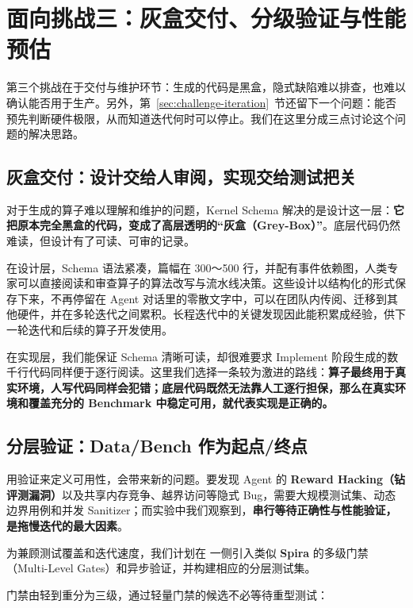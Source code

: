 \SourceSeparator
\clearpage
\section{面向挑战三：灰盒交付、分级验证与性能预估}\label{sec:graybox}
第三个挑战在于交付与维护环节：生成的代码是黑盒，隐式缺陷难以排查，也难以确认能否用于生产。另外，第~\ref{sec:challenge-iteration}~节还留下一个问题：能否预先判断硬件极限，从而知道迭代何时可以停止。我们在这里分成三点讨论这个问题的解决思路。


\SourceSeparator
\subsection{灰盒交付：设计交给人审阅，实现交给测试把关}\label{sec:black-to-gray}
对于生成的算子难以理解和维护的问题，Kernel Schema 解决的是设计这一层：\textbf{它把原本完全黑盒的代码，变成了高层透明的“灰盒（Grey-Box）”}。底层代码仍然难读，但设计有了可读、可审的记录。


在设计层，Schema 语法紧凑，篇幅在 300～500 行，并配有事件依赖图，人类专家可以直接阅读和审查算子的算法改写与流水线决策。这些设计以结构化的形式保存下来，不再停留在 Agent 对话里的零散文字中，可以在团队内传阅、迁移到其他硬件，并在多轮迭代之间累积。长程迭代中的关键发现因此能积累成经验，供下一轮迭代和后续的算子开发使用。


在实现层，我们能保证 Schema 清晰可读，却很难要求 Implement 阶段生成的数千行代码同样便于逐行阅读。这里我们选择一条较为激进的路线：\textbf{算子最终用于真实环境，人写代码同样会犯错；底层代码既然无法靠人工逐行担保，那么在真实环境和覆盖充分的 Benchmark 中稳定可用，就代表实现是正确的。}


\SourceSeparator
\subsection{分层验证：Data/Bench 作为起点/终点}\label{sec:tiered-verification}
用验证来定义可用性，会带来新的问题。要发现 Agent 的 \textbf{Reward Hacking（钻评测漏洞）}以及共享内存竞争、越界访问等隐式 Bug，需要大规模测试集、动态边界用例和并发 Sanitizer；而实验中我们观察到，\textbf{串行等待正确性与性能验证，是拖慢迭代的最大因素}。


为兼顾测试覆盖和迭代速度，我们计划在  一侧引入类似 \textbf{Spira} 的多级门禁（Multi-Level Gates）和异步验证，并构建相应的分层测试集。


门禁由轻到重分为三级，通过轻量门禁的候选不必等待重型测试：


